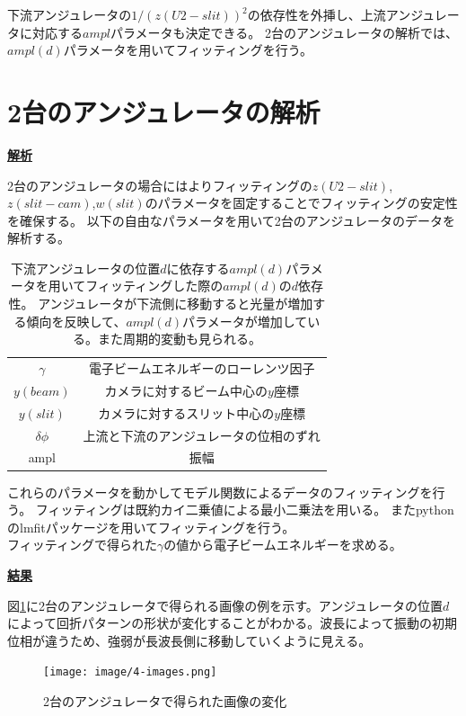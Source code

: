 \documentclass[a4paper,11pt,uplatex]{jsbook}
\begin{document}
下流アンジュレータの$1/(z(U2-slit))^2$の依存性を外挿し、上流アンジュレータに対応する$ampl$パラメータも決定できる。
2台のアンジュレータの解析では、$ampl(d)$パラメータを用いてフィッティングを行う。

\section{2台のアンジュレータの解析}
\noindent \textbf{\underline{解析}}\par
2台のアンジュレータの場合にはよりフィッティングの$z(U2-slit)$,$z(slit-cam)$,$w(slit)$のパラメータを固定することでフィッティングの安定性を確保する。
以下の自由なパラメータを用いて2台のアンジュレータのデータを解析する。
\begin{table}[h]
\centering
\begin{tabular}{c|c}
  $\gamma$ & 電子ビームエネルギーのローレンツ因子 \\
  $y(beam)$ & カメラに対するビーム中心の$y$座標 \\
  $y(slit)$ & カメラに対するスリット中心の$y$座標 \\
  $\delta \phi$ & 上流と下流のアンジュレータの位相のずれ\\
  ampl & 振幅
\end{tabular}
\caption[位置に依存する振幅パラメータによるフィッティング]{下流アンジュレータの位置$d$に依存する$ampl(d)$パラメータを用いてフィッティングした際の$ampl(d)$の$d$依存性。
アンジュレータが下流側に移動すると光量が増加する傾向を反映して、$ampl(d)$パラメータが増加している。また周期的変動も見られる。}
\end{table}

これらのパラメータを動かしてモデル関数によるデータのフィッティングを行う。
フィッティングは既約カイ二乗値による最小二乗法を用いる。
またpythonのlmfitパッケージ\cite{lmfit}を用いてフィッティングを行う。\\
フィッティングで得られた$\gamma$の値から電子ビームエネルギーを求める。

\noindent \textbf{\underline{結果}}\par
図\ref{images}に2台のアンジュレータで得られる画像の例を示す。アンジュレータの位置$d$によって回折パターンの形状が変化することがわかる。波長によって振動の初期位相が違うため、強弱が長波長側に移動していくように見える。
\begin{figure}[h]
  \centering
  \texttt{[image: image/4-images.png]}
  \caption[干渉による画像の変化]{2台のアンジュレータで得られた画像の変化}\label{images}
\end{figure}
\end{document}
